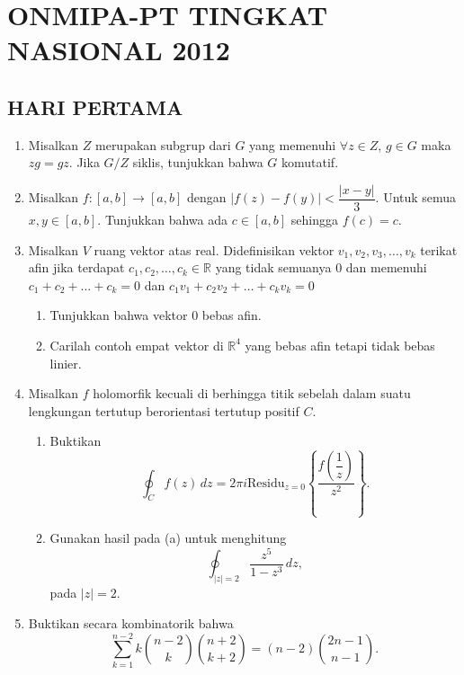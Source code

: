 \documentclass[12pt,twoside]{article}
\begin{document}
\section{ONMIPA-PT TINGKAT NASIONAL 2012}
\subsection{HARI PERTAMA}
\begin{enumerate}

    \item Misalkan $Z$ merupakan subgrup dari $G$ yang memenuhi $\forall z\in Z$, $g\in G$ maka $zg=gz$. Jika $G/Z$ siklis, tunjukkan bahwa $G$ komutatif.

    \item Misalkan $f:[a,b]\to[a,b]$ dengan $|f(z)-f(y)|<\dfrac{|x-y|}{3}$. Untuk semua $x,y\in [a,b]$. Tunjukkan bahwa ada $c\in[a,b]$ sehingga $f(c)=c$.

    \item Misalkan $V$ ruang vektor atas real. Didefinisikan vektor $v_1,v_2,v_3,\dots,v_k$ terikat afin jika terdapat $c_1,c_2,\dots,c_k\in\mathbb{R}$ yang tidak semuanya $0$ dan memenuhi $c_1+c_2+\dots+c_k=0$ dan $c_1v_1+c_2v_2+\dots+c_kv_k=0$
          \begin{enumerate}
              \item [(a)] Tunjukkan bahwa vektor 0 bebas afin.
              \item[b)] Carilah contoh empat vektor di $\mathbb{R}^4$ yang bebas afin tetapi tidak bebas  linier.
          \end{enumerate}

    \item Misalkan $f$ holomorfik kecuali di berhingga titik sebelah dalam suatu lengkungan tertutup berorientasi tertutup positif $C$.
          \begin{enumerate}
              \item [(a)] Buktikan $$\oint_{C}f(z)\,dz=2\pi i\text{Residu}_{z=0}\left\lbrace\dfrac{f\left(\dfrac{1}{z}\right)}{z^2}\right\rbrace.$$
              \item[(b)] Gunakan hasil pada (a) untuk menghitung $$\oint_{|z|=2}\dfrac{z^5}{1-z^3}\,dz,$$
                    pada $|z|=2$.

          \end{enumerate}

    \item Buktikan secara kombinatorik bahwa
          $$\sum_{k=1}^{n-2}k\binom{n-2}{k}\binom{n+2}{k+2}=\left(n-2\right)\binom{2n-1}{n-1}.$$
\end{enumerate}
\newpage
\end{document}
